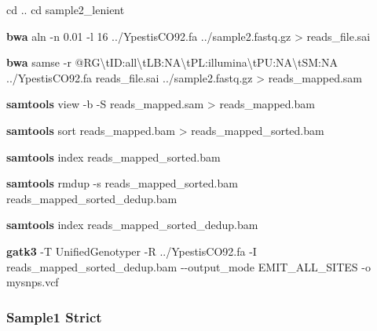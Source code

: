 \documentclass[
  letterpaper,
]{book}
\newenvironment{Shaded}{}{}
\newcommand{\AttributeTok}[1]{\textcolor[rgb]{0.84,0.23,0.29}{#1}}
\newcommand{\BuiltInTok}[1]{\textcolor[rgb]{0.84,0.23,0.29}{#1}}
\newcommand{\ExtensionTok}[1]{\textcolor[rgb]{0.84,0.23,0.29}{\textbf{#1}}}
\newcommand{\NormalTok}[1]{\textcolor[rgb]{0.14,0.16,0.18}{#1}}
\newcommand{\OperatorTok}[1]{\textcolor[rgb]{0.14,0.16,0.18}{#1}}
\newcommand{\StringTok}[1]{\textcolor[rgb]{0.01,0.18,0.38}{#1}}
\begin{document}
\begin{Shaded}
\begin{Highlighting}[]
\BuiltInTok{cd}\NormalTok{ ..}
\BuiltInTok{cd}\NormalTok{ sample2\_lenient}

\ExtensionTok{bwa}\NormalTok{ aln }\AttributeTok{{-}n}\NormalTok{ 0.01 }\AttributeTok{{-}l}\NormalTok{ 16 ../YpestisCO92.fa ../sample2.fastq.gz }\OperatorTok{\textgreater{}}\NormalTok{ reads\_file.sai}

\ExtensionTok{bwa}\NormalTok{ samse }\AttributeTok{{-}r} \StringTok{\textquotesingle{}@RG\textbackslash{}tID:all\textbackslash{}tLB:NA\textbackslash{}tPL:illumina\textbackslash{}tPU:NA\textbackslash{}tSM:NA\textquotesingle{}}\NormalTok{ ../YpestisCO92.fa reads\_file.sai ../sample2.fastq.gz }\OperatorTok{\textgreater{}}\NormalTok{ reads\_mapped.sam}

\ExtensionTok{samtools}\NormalTok{ view }\AttributeTok{{-}b} \AttributeTok{{-}S}\NormalTok{ reads\_mapped.sam }\OperatorTok{\textgreater{}}\NormalTok{ reads\_mapped.bam}

\ExtensionTok{samtools}\NormalTok{ sort reads\_mapped.bam }\OperatorTok{\textgreater{}}\NormalTok{ reads\_mapped\_sorted.bam}

\ExtensionTok{samtools}\NormalTok{ index reads\_mapped\_sorted.bam}

\ExtensionTok{samtools}\NormalTok{ rmdup }\AttributeTok{{-}s}\NormalTok{ reads\_mapped\_sorted.bam reads\_mapped\_sorted\_dedup.bam}

\ExtensionTok{samtools}\NormalTok{ index reads\_mapped\_sorted\_dedup.bam}

\ExtensionTok{gatk3} \AttributeTok{{-}T}\NormalTok{ UnifiedGenotyper }\AttributeTok{{-}R}\NormalTok{ ../YpestisCO92.fa }\AttributeTok{{-}I}\NormalTok{ reads\_mapped\_sorted\_dedup.bam }\AttributeTok{{-}{-}output\_mode}\NormalTok{ EMIT\_ALL\_SITES }\AttributeTok{{-}o}\NormalTok{ mysnps.vcf}
\end{Highlighting}
\end{Shaded}

\hypertarget{sample1-strict}{%
\subsubsection{Sample1 Strict}\label{sample1-strict}}
\end{document}

